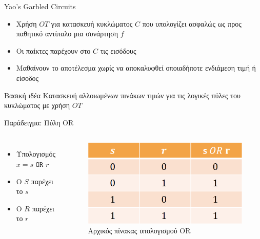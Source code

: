 \documentclass[handout]{beamer}
\begin{document}
\begin{frame}{Yao's Garbled Circuits}
	\begin{itemize}
		\item Χρήση $OT$ για κατασκευή κυκλώματος $C$ που υπολογίζει ασφαλώς ως προς παθητικό αντίπαλο μια συνάρτηση $f$
		\item Οι παίκτες παρέχουν στο $C$ τις εισόδους
		\item Mαθαίνουν το αποτέλεσμα χωρίς να αποκαλυφθεί οποιαδήποτε ενδιάμεση τιμή ή είσοδος
	\end{itemize}
	\begin{block}{Βασική ιδέα}
		Κατασκευή αλλοιωμένων πινάκων τιμών για τις λογικές πύλες του κυκλώματος με χρήση $OT$ 
	\end{block}
\end{frame}

\begin{frame}{Παράδειγμα: Πύλη OR}
	\begin{columns}
		\begin{itemize}
			\item Υπολογισμός $x = s$ $\mathtt{OR}$ $r$
			\item O $S$ παρέχει το $s$
			\item O $R$ παρέχει το $r$
		\end{itemize}
		\begin{figure}
			\centering
			\includegraphics[width=\textwidth]{ot_or.png}
			\caption{Αρχικός πίνακας υπολογισμού OR}			 
		\end{figure}
	\end{columns}	
\end{frame}
\end{document}
